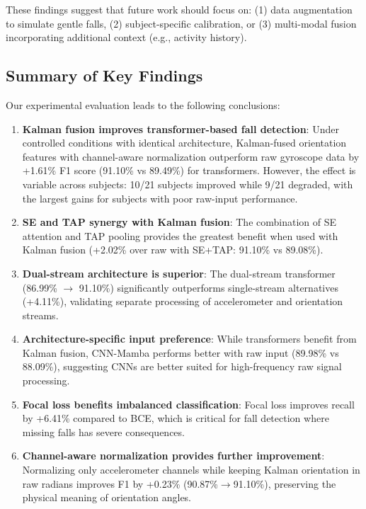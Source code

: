 These findings suggest that future work should focus on: (1) data augmentation to simulate gentle falls, (2) subject-specific calibration, or (3) multi-modal fusion incorporating additional context (e.g., activity history).

\subsection{Summary of Key Findings}

Our experimental evaluation leads to the following conclusions:

\begin{enumerate}
    \item \textbf{Kalman fusion improves transformer-based fall detection}: Under controlled conditions with identical architecture, Kalman-fused orientation features with channel-aware normalization outperform raw gyroscope data by +1.61\% F1 score (91.10\% vs 89.49\%) for transformers. However, the effect is variable across subjects: 10/21 subjects improved while 9/21 degraded, with the largest gains for subjects with poor raw-input performance.

    \item \textbf{SE and TAP synergy with Kalman fusion}: The combination of SE attention and TAP pooling provides the greatest benefit when used with Kalman fusion (+2.02\% over raw with SE+TAP: 91.10\% vs 89.08\%).

    \item \textbf{Dual-stream architecture is superior}: The dual-stream transformer (86.99\% $\rightarrow$ 91.10\%) significantly outperforms single-stream alternatives (+4.11\%), validating separate processing of accelerometer and orientation streams.

    \item \textbf{Architecture-specific input preference}: While transformers benefit from Kalman fusion, CNN-Mamba performs better with raw input (89.98\% vs 88.09\%), suggesting CNNs are better suited for high-frequency raw signal processing.

    \item \textbf{Focal loss benefits imbalanced classification}: Focal loss improves recall by +6.41\% compared to BCE, which is critical for fall detection where missing falls has severe consequences.

    \item \textbf{Channel-aware normalization provides further improvement}: Normalizing only accelerometer channels while keeping Kalman orientation in raw radians improves F1 by +0.23\% (90.87\%$\rightarrow$91.10\%), preserving the physical meaning of orientation angles.


\end{enumerate}
